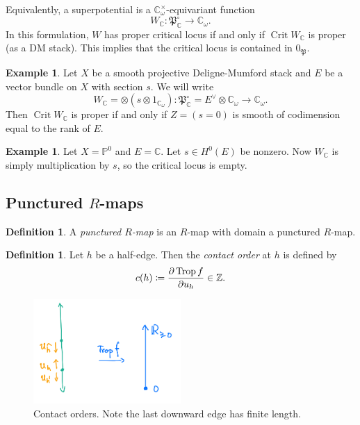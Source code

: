 \documentclass[10pt,oldfontcommands,oneside]{memoir}
\theoremstyle{definition}
\newtheorem{defn}[thm]{Definition}
\newtheorem{exm}[thm]{Example}
\theoremstyle{remark}
\theoremstyle{plain}
\theoremstyle{definition}
\theoremstyle{remark}
\newcommand{\C}{\mathbb{C}}
\newcommand{\Z}{\mathbb{Z}}
\renewcommand{\P}{\mathbb{P}}
\newcommand{\mf}[1]{\mathfrak{#1}}
\newcommand{\on}[1]{\operatorname{#1}}
\newcommand{\1}{\mathbf{1}}
\newcommand{\2}{\mathbf{2}}
\newcommand{\3}{\mathbf{3}}
\DeclareMathOperator{\Crit}{Crit}
\begin{document}
Equivalently, a superpotential is a $\C_{\omega}^{\times}$-equivariant function
\[ W_{\C} \colon \mf{P}_{\C}^{\circ} \to \C_{\omega}. \]
In this formulation, $W$ has proper critical locus if and only if $\on{Crit} W_{\C}$ is proper (as a DM stack). This implies that the critical locus is contained in $0_{\mf{P}}$.

\begin{exm}
    Let $X$ be a smooth projective Deligne-Mumford stack and $E$ be a vector bundle on $X$ with section $s$. We will write
    \[ W_{\C} = \otimes (s \otimes 1_{\C_{\omega}}) \colon \mf{P}_{\C}^{\circ} = E^{\vee} \otimes \C_{\omega} \to \C_{\omega}. \]
    Then $\Crit W_{\C}$ is proper if and only if $Z = (s=0)$ is smooth of codimension equal to the rank of $E$.
\end{exm}

\begin{exm}
    Let $X = \P^0$ and $E = \C$. Let $s \in H^0(E)$ be nonzero. Now $W_{\C}$ is simply multiplication by $s$, so the critical locus is empty.
\end{exm}

\subsection{Punctured $R$-maps}%
\label{sub:Punctured R-maps}

\begin{defn}
    A \textit{punctured $R$-map} is an $R$-map with domain a punctured $R$-map.
\end{defn}

\begin{defn}
    Let $h$ be a half-edge. Then the \textit{contact order} at $h$ is defined by
    \[ c(h) \coloneqq \pdv{\on{Trop} f}{u_h} \in \Z. \]
\end{defn}

\begin{figure}[htpb]
    \centering
    \includegraphics[width=0.5\textwidth]{interval.png}
    \caption{Contact orders. Note the last downward edge has finite length.}
    \label{fig:interval-png}
\end{figure}
\end{document}
